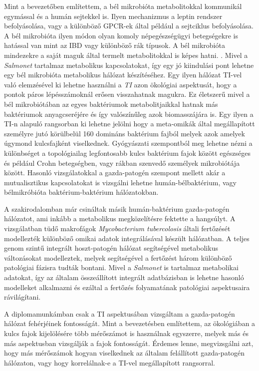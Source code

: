 \documentclass[a4paper,12pt]{article}
\begin{document}
		Mint a bevezetőben említettem, a bél mikrobióta metabolitokkal kommunikál egymással és a humán sejtekkel is. Ilyen mechanizmus a leptin rendszer befolyásolása, vagy a különböző GPCR-ek által például a sejtciklus befolyásolása. \cite{buthyrate_immune} A bél mikrobióta ilyen módon olyan komoly népegészségügyi betegségekre is hatással van mint az IBD vagy különböző rák típusok. \cite{gut_microbiome} A bél mikrobióta mindezekre a saját maguk által termelt metabolitokkal is képes hatni. \cite{scfa_and_vitamine}. Mivel a \textit{Salmonet} tartalmaz metabolikus kapcsolatokat, így egy jó kiindulási pont lehetne egy bél mikrobióta metabolikus hálózat készítéséhez. Egy ilyen hálózat TI-vel való elemzésével ki lehetne használni a \textit{TI} azon ökológiai aspektusát, hogy a pontok páros lépésszámoknál erősen visszahatnak magukra. Ez életszerű mivel a bél mikrobiótában az egyes baktériumok metabolitjaikkal hatnak más baktériumok anyagcseréjére és így valószínűleg azok biomasszájára is. \cite{gut_microbiome} Egy ilyen a TI-n alapuló rangsorban ki lehetne jelölni hogy a meta-omikák által megállapított személyre jutó körülbelül 160 domináns baktérium fajból \cite{meta_omics} melyek azok amelyek úgymond kulcsfajként viselkednek. Gyógyászati szempontból meg lehetne nézni a különbséget a topológiailag legfontosabb kulcs baktérium fajok között egészséges és például Crohn betegségben, vagy rákban szenvedő személyek mikrobiótája között. Hasonló vizsgálatokkal a gazda-patogén szempont mellett akár a mutualisztikus kapcsolatokat is vizsgálni lehetne humán-bélbaktérium, vagy bélmikróbióta baktérium-baktérium hálózatokban.
 
 		A szakirodalomban már csináltak másik humán-baktérium gazda-patogén hálózatot, ami inkább a metabolikus megközelítésre fektette a hangsúlyt. A vizsgálatban tüdő makrofágok \textit{Mycobacterium tubercolosis} általi fertőzését modellezték különböző omikai adatok integrálásával készült hálózatban. A teljes genom szintű integrált hoszt-patogén hálózat segítségével metabolikus változásokat modelleztek, melyek segítségével a fertőzést három különböző patológiai fázisra tudták bontani. \cite{discussion_alveolar_macrophage} Mivel a \textit{Salmonet} is tartalmaz metabolikai adatokat, így az általam összeállított integrált adatbázisban is lehetne hasonló modelleket alkalmazni és ezáltal a fertőzés folyamatának patológiai aspektusaira rávilágítani.
		
		A diplomamunkámban csak a TI aspektusában vizsgáltam a gazda-patogén hálózat fehérjéinek fontosságát. Mint a bevezetésben említettem, az ökológiában a kulcs fajok kijelölésére több mérőszámot is használnak egyszerre, melyek más és más aspektusban vizsgálják a fajok fontosságát.\cite{jordan_comparison} \cite{ti} Érdemes lenne, megvizsgálni azt, hogy más mérőszámok hogyan viselkednek az általam felállított gazda-patogén hálózaton, vagy hogy korrelálnak-e a TI-vel megállapított rangsorral.
\end{document}
